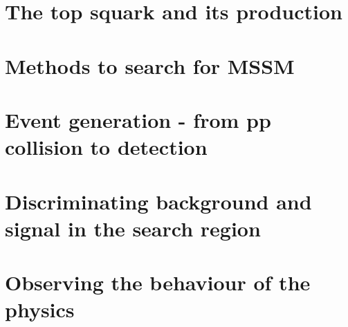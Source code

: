 \documentclass[12pt,a4paper]{report}
\begin{document}
\chapter{The top squark and its production}


\chapter{Methods to search for MSSM}


\chapter{Event generation - from pp collision to detection}




\chapter{Discriminating background and signal in the search region}


\chapter{Observing the behaviour of the physics}

\end{document}
